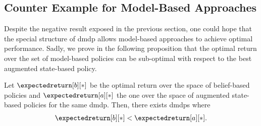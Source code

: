\subsection{Counter Example for Model-Based Approaches}
\label{subsec:model_based_sub_optimal}

Despite the negative result exposed in the previous section, one could hope that the special structure of \gls{dmdp} allows model-based approaches to achieve optimal performance. 
Sadly, we prove in the following proposition that the optimal return over the set of model-based policies can be sub-optimal with respect to the best augmented state-based policy.

\begin{prop}
\label{pp:counter_example_belief_based}
    Let $\expectedreturn[b][*]$ be the optimal return over the space of belief-based policies and $\expectedreturn[a][*]$ the one over the space of augmented state-based policies for the same \gls{dmdp}. Then, there exists \glspl{dmdp} where
    \begin{align*}
        \expectedreturn[b][*]<\expectedreturn[a][*].
    \end{align*}
\end{prop}
